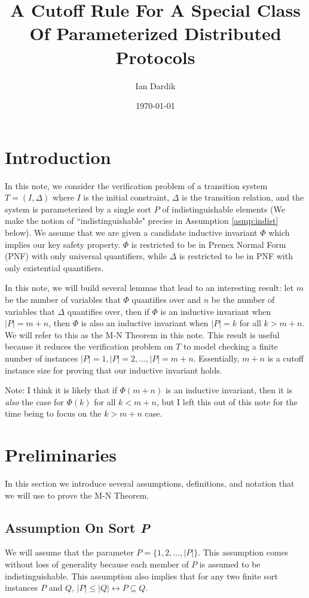 \documentclass[12pt]{article}
\title{A Cutoff Rule For A Special Class Of Parameterized Distributed Protocols}
\author{Ian Dardik}
\date{\today}
\theoremstyle{definition}
\theoremstyle{remark}
\begin{document}
\maketitle

\section{Introduction}
In this note, we consider the verification problem of a transition system $T=(I,\Delta)$ where $I$ is the initial constraint, $\Delta$ is the transition relation, and the system is parameterized by a single sort $P$ of indistinguishable elements (We make the notion of ``indistinguishable" precise in Assumption \ref{asmp:indist} below).  We assume that we are given a candidate inductive invariant $\Phi$ which implies our key safety property.  $\Phi$ is restricted to be in Prenex Normal Form (PNF) with only universal quantifiers, while $\Delta$ is restricted to be in PNF with only existential quantifiers.

In this note, we will build several lemmas that lead to an interesting result: let $m$ be the number of variables that $\Phi$ quantifies over and $n$ be the number of variables that $\Delta$ quantifies over, then if $\Phi$ is an inductive invariant when $|P|=m+n$, then $\Phi$ is also an inductive invariant when $|P|=k$ for all $k>m+n$.  We will refer to this as the M-N Theorem in this note.  This result is useful because it reduces the verification problem on $T$ to model checking a finite number of instances $|P|=1,|P|=2,...,|P|=m+n$.  Essentially, $m+n$ is a cutoff instance size for proving that our inductive invariant holds.

Note: I think it is likely that if $\Phi(m+n)$ is an inductive invariant, then it is \textit{also} the case for $\Phi(k)$ for all $k<m+n$, but I left this out of this note for the time being to focus on the $k>m+n$ case.



\section{Preliminaries}
In this section we introduce several assumptions, definitions, and notation that we will use to prove the M-N Theorem.

\subsection{Assumption On Sort \textit{P}}
We will assume that the parameter $P = \{1,2,...,|P|\}$.  This assumption comes without loss of generality because each member of $P$ is assumed to be indistinguishable.  This assumption also implies that for any two finite sort instances $P$ and $Q$, $|P| \leq |Q| \leftrightarrow P \subseteq Q$.
\end{document}
